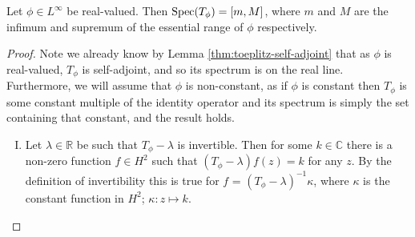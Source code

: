 \documentclass[../main.tex]{subfiles}
\begin{document}
\begin{theorem}\label{thm:hartman-wintner}
Let $\phi \in L^\infty$ be real-valued. Then $\mathrm{Spec}(T_\phi) = [m, M]$, where $m$
and $M$ are the infimum and supremum of the essential range of $\phi$ respectively.
\end{theorem}
\begin{proof}
Note we already know by Lemma \ref{thm:toeplitz-self-adjoint} that as $\phi$ is
real-valued, $T_\phi$ is self-adjoint, and so its spectrum is on the
real line. Furthermore, we will assume that $\phi$ is non-constant, as
if $\phi$ is constant then $T_\phi$ is some constant multiple of the
identity operator and its spectrum is simply the set containing that constant,
and the result holds. 
\begin{enumerate}[I.]
\item Let $\lambda \in \mathbb{R}$ be such that $T_\phi - \lambda$ is
invertible. Then for some $k \in \mathbb{C}$ there is a non-zero
function $f \in H^2$ such that $(T_\phi - \lambda)f(z) = k$ for
any $z$. By the definition of invertibility this is true for $f$
= $(T_\phi - \lambda)^{-1}\kappa$, where $\kappa$ is the
constant function in $H^2$; $\kappa : z \mapsto k$.


\end{enumerate}
\end{proof}
\end{document}
